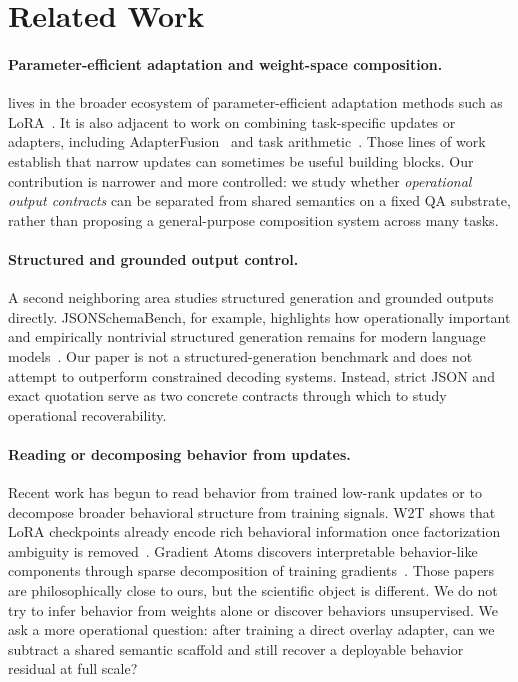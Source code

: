 
\section{Related Work}

\paragraph{Parameter-efficient adaptation and weight-space composition.}
\method{} lives in the broader ecosystem of parameter-efficient adaptation methods such as LoRA~\citep{hu2022lora}. It is also adjacent to work on combining task-specific updates or adapters, including AdapterFusion~\citep{pfeiffer2021adapterfusion} and task arithmetic~\citep{ilharco2023task}. Those lines of work establish that narrow updates can sometimes be useful building blocks. Our contribution is narrower and more controlled: we study whether \emph{operational output contracts} can be separated from shared semantics on a fixed QA substrate, rather than proposing a general-purpose composition system across many tasks.

\paragraph{Structured and grounded output control.}
A second neighboring area studies structured generation and grounded outputs directly. JSONSchemaBench, for example, highlights how operationally important and empirically nontrivial structured generation remains for modern language models~\citep{geng2025jsonschemabench}. Our paper is not a structured-generation benchmark and does not attempt to outperform constrained decoding systems. Instead, strict JSON and exact quotation serve as two concrete contracts through which to study operational recoverability.

\paragraph{Reading or decomposing behavior from updates.}
Recent work has begun to read behavior from trained low-rank updates or to decompose broader behavioral structure from training signals. W2T shows that LoRA checkpoints already encode rich behavioral information once factorization ambiguity is removed~\citep{han2026w2t}. Gradient Atoms discovers interpretable behavior-like components through sparse decomposition of training gradients~\citep{rosser2026gradientatoms}. Those papers are philosophically close to ours, but the scientific object is different. We do not try to infer behavior from weights alone or discover behaviors unsupervised. We ask a more operational question: after training a direct overlay adapter, can we subtract a shared semantic scaffold and still recover a deployable behavior residual at full scale?

